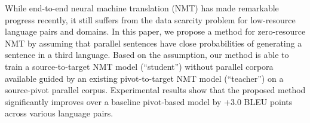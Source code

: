 While end-to-end neural machine translation (NMT) has made remarkable progress recently, it still suffers from the data scarcity problem for low-resource language pairs and domains. In this paper, we propose a method for zero-resource NMT by assuming that parallel sentences have close probabilities of generating a sentence in a third language. Based on the assumption, our method is able to train a source-to-target NMT model (``student'') without parallel corpora available guided by an existing pivot-to-target NMT model (``teacher'') on a source-pivot parallel corpus. Experimental results show that the proposed method significantly improves over a baseline pivot-based model by +3.0 BLEU points across various language pairs.
